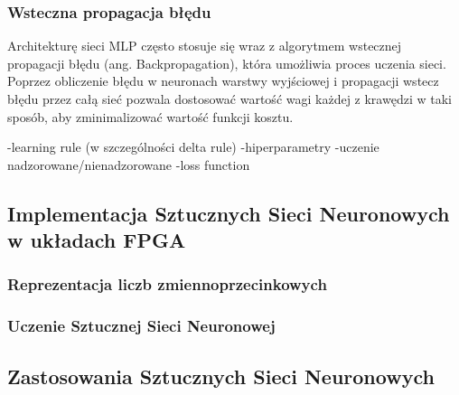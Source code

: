 \subsubsection{Wsteczna propagacja błędu}
Architekturę sieci MLP często stosuje się wraz z algorytmem wstecznej 
propagacji błędu (ang. Backpropagation), która umożliwia proces uczenia sieci.
Poprzez obliczenie błędu w neuronach warstwy wyjściowej i propagacji 
wstecz błędu przez całą sieć pozwala dostosować wartość wagi każdej z krawędzi 
w taki sposób, aby zminimalizować wartość funkcji kosztu.

-learning rule (w szczególności delta rule)
-hiperparametry
-uczenie nadzorowane/nienadzorowane
-loss function



\subsection{Implementacja Sztucznych Sieci Neuronowych w układach FPGA}
\subsubsection{Reprezentacja liczb zmiennoprzecinkowych}
\subsubsection{Uczenie Sztucznej Sieci Neuronowej}
\subsection{Zastosowania Sztucznych Sieci Neuronowych}